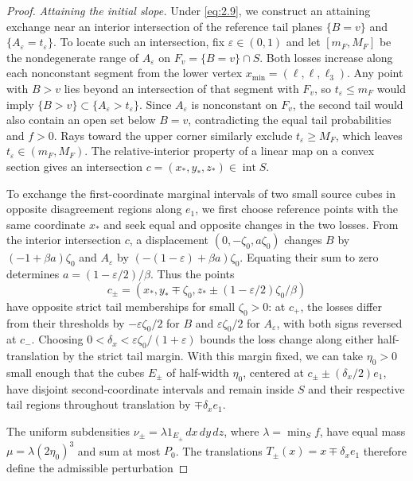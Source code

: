 \begin{proof}
\label{par:initial-slope-attainment}
\emph{Attaining the initial slope.} Under \eqref{eq:2.9}, we construct an attaining exchange near an interior intersection of the reference tail planes \(\{B=v\}\) and \(\{A_\varepsilon=t_\varepsilon\}\). To locate such an intersection, fix \(\varepsilon\in(0,1)\) and let \([m_F,M_F]\) be the nondegenerate range of \(A_\varepsilon\) on \(F_v=\{B=v\}\cap S\). Both losses increase along each nonconstant segment from the lower vertex \(x_{\min}=(\ell,\ell,\ell_3)\). Any point with \(B>v\) lies beyond an intersection of that segment with \(F_v\), so \(t_\varepsilon\le m_F\) would imply \(\{B>v\}\subset\{A_\varepsilon>t_\varepsilon\}\). Since \(A_\varepsilon\) is nonconstant on \(F_v\), the second tail would also contain an open set below \(B=v\), contradicting the equal tail probabilities and \(f>0\). Rays toward the upper corner similarly exclude \(t_\varepsilon\ge M_F\), which leaves \(t_\varepsilon\in(m_F,M_F)\). The relative-interior property of a linear map on a convex section gives an intersection \(c=(x_*,y_*,z_*)\in\operatorname{int}S\).

To exchange the first-coordinate marginal intervals of two small source cubes in opposite disagreement regions along \(e_1\), we first choose reference points with the same coordinate \(x_*\) and seek equal and opposite changes in the two losses. From the interior intersection \(c\), a displacement \((0,-\zeta_0,a\zeta_0)\) changes \(B\) by \((-1+\beta a)\zeta_0\) and \(A_\varepsilon\) by \((-(1-\varepsilon)+\beta a)\zeta_0\). Equating their sum to zero determines \(a=(1-\varepsilon/2)/\beta\). Thus the points
\[
c_\pm=(x_*,y_*\mp \zeta_0,z_*\pm(1-\varepsilon/2)\zeta_0/\beta)
\]
have opposite strict tail memberships for small \(\zeta_0>0\): at \(c_+\), the losses differ from their thresholds by \(-\varepsilon \zeta_0/2\) for \(B\) and \(\varepsilon \zeta_0/2\) for \(A_\varepsilon\), with both signs reversed at \(c_-\). Choosing \(0<\delta_x<\varepsilon\zeta_0/(1+\varepsilon)\) bounds the loss change along either half-translation by the strict tail margin. With this margin fixed, we can take \(\eta_0>0\) small enough that the cubes \(E_\pm\) of half-width \(\eta_0\), centered at \(c_\pm\pm(\delta_x/2)e_1\), have disjoint second-coordinate intervals and remain inside \(S\) and their respective tail regions throughout translation by \(\mp\delta_xe_1\).

The uniform subdensities \(\nu_\pm=\lambda1_{E_\pm}\,dx\,dy\,dz\), where \(\lambda=\min_Sf\), have equal mass \(\mu=\lambda(2\eta_0)^3\) and sum at most \(P_0\). The translations \(T_\pm(x)=x\mp\delta_xe_1\) therefore define the admissible perturbation


\end{proof}
